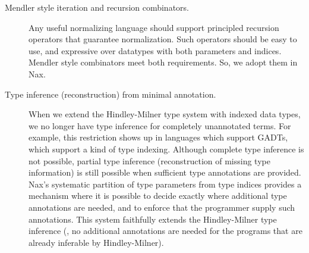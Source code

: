 \begin{description}
\item[Mendler style iteration and recursion combinators.] Any useful normalizing
language should support principled recursion operators that guarantee
normalization. Such operators should be easy to use, and expressive over datatypes
with both parameters and indices. Mendler style combinators meet both requirements.
So, we adopt them in Nax.

\item[Type inference (reconstruction) from minimal annotation.]
When we extend the Hindley-Milner type system with indexed data types, 
we no longer have type inference for completely unannotated terms.
For example, this restriction shows up in languages which support GADTs,
which support a kind of type indexing.
Although complete
type inference is not possible, partial type inference (reconstruction of missing
type information) is
still possible when sufficient type annotations are provided. Nax's
systematic partition of type parameters from type indices provides
a mechanism where it is possible to decide exactly where
additional type annotations are needed, and to enforce that the
programmer supply such annotations. This system faithfully extends the Hindley-Milner
type inference (\ie, no additional annotations are needed for the programs that are
already inferable by Hindley-Milner).
\end{description}

